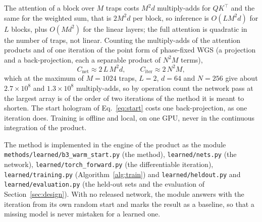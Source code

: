 The attention of a block over $M$ traps costs $M^2d$ multiply-adds for $QK^\top$ and the same for the weighted sum, that is $2M^2d$ per block, so inference is $O(LM^2d)$ for $L$ blocks, plus $O(Md^2)$ for the linear layers; the full attention is quadratic in the number of traps, not linear. Counting the multiply-adds of the attention products and of one iteration of the point form of phase-fixed WGS (a projection and a back-projection, each a separable product of $N^2M$ terms),
\begin{equation}
C_{\mathrm{net}}\approx 2\,L\,M^{2}d,\qquad C_{\mathrm{iter}}\approx 2\,N^{2}M,
\label{eq:cost}
\end{equation}
which at the maximum of $M=1024$ traps, $L=2$, $d=64$ and $N=256$ give about $2.7\times10^{8}$ and $1.3\times10^{8}$ multiply-adds, so by operation count the network pass at the largest array is of the order of two iterations of the method it is meant to shorten. The start hologram of Eq.~\eqref{eq:start} costs one back-projection, as one iteration does. Training is offline and local, on one GPU, never in the continuous
integration of the product.

The method is implemented in the engine of the product as the module \texttt{methods/learned/b3\_warm\_start.py} (the method), \texttt{learned/nets.py} (the network), \texttt{learned/torch\_forward.py} (the differentiable iteration), \texttt{learned/training.py} (Algorithm~\ref{alg:train}) and \texttt{learned/heldout.py} and \texttt{learned/evaluation.py} (the held-out sets and the evaluation of Section~\ref{sec:design}). With no released network, the module answers with the iteration from its own random start and marks the result as a baseline, so that
a missing model is never mistaken for a learned one.

